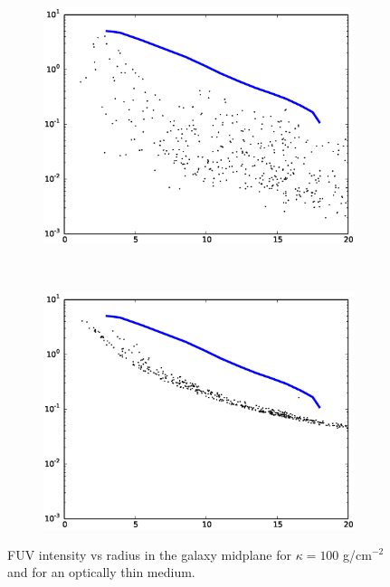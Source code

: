 \begin{figure}
        \centering
        \begin{subfigure}[b]{0.45\textwidth}
                \includegraphics[width=\textwidth]{graphics/intensityvrRadFUVop10000200.eps}
                \label{fig:intensity100}
        \end{subfigure}
        ~ 
        \begin{subfigure}[b]{0.45\textwidth}
                \includegraphics[width=\textwidth]{graphics/intensityvrRadFUVthin00200.eps}
                \label{fig:intensitythin}
        \end{subfigure}
        \caption[Intensity with varying opacity.]{FUV intensity vs radius in the galaxy midplane for $\kappa = 100$ g/cm$^{-2}$ and for an optically thin medium.}
        \label{fig:intensityvopacity}
\end{figure}

